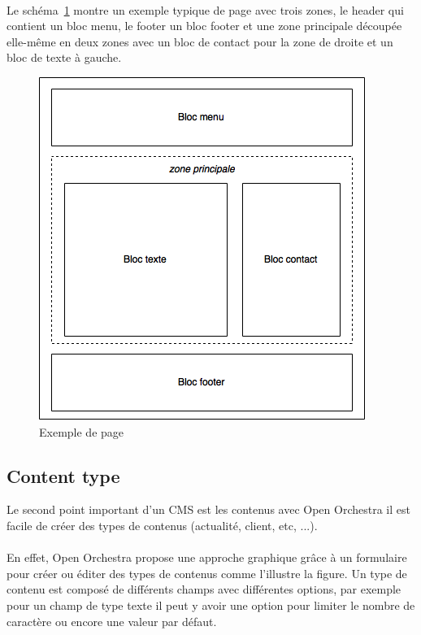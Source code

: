          \paragraph{}
		Le schéma~\ref{node} montre un exemple typique de page avec trois zones, le header qui contient un bloc menu, le footer un bloc footer et une zone principale découpée elle-même en deux zones avec un bloc de contact pour la zone de droite et un bloc de texte à gauche.
		\begin{figure}[H]
        \begin{center}
          \includegraphics[scale=0.75]{images/node}
        \end{center}
        \caption{Exemple de page}
        \label{node}
      \end{figure}
         \subsection{Content type}
         Le second point important d'un CMS est les contenus avec Open Orchestra il est facile de créer des types de contenus (actualité, client, etc, ...).
          \paragraph{}
          En effet, Open Orchestra propose une approche graphique grâce à un formulaire pour créer ou éditer des types de contenus comme l'illustre la figure.
          Un type de contenu est composé de différents champs avec différentes options, par exemple pour un champ de type texte il peut y avoir une option pour limiter le nombre de caractère ou encore une valeur par défaut.
